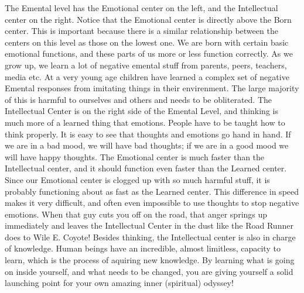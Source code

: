 \documentclass[12pt,letterpaper]{book}
\begin{document}
The Emental level has the Emotional center on the left, and the Intellectual center on the right. Notice that the Emotional center is directly above the Born center. This is important because there is a similar relationship between the centers on this level as those on the lowest one. We are born with certain basic emotional functions, and these parts of us more or less function correctly. As we grow up, we learn a lot of negative emental stuff from parents, peers, teachers, media etc. At a very young age children have learned a complex set of negative Emental responses from imitating things in their envirenment. The large majority of this is harmful to ourselves and others and needs to be obliterated. The Intellectual Center is on the right side of the Emental Level, and thinking is much more of a learned thing that emotions. People have to be taught how to think properly. It is easy to see that thoughts and emotions go hand in hand. If we are in a bad mood, we will have bad thoughts; if we are in a good mood we will have happy thoughts. The Emotional center is much faster than the Intellectual center, and it should function even faster than the Learned center. Since our Emotional center is clogged up with so much harmful stuff, it is probably functioning about as fast as the Learned center. This difference in speed makes it very difficult, and often even impossible to use thoughts to stop negative emotions. When that guy cuts you off on the road, that anger springs up immediately and leaves the Intellectual Center in the dust like the Road Runner does to Wile E. Coyote! Besides thinking, the Intellectual center is also in charge of knowledge. Human beings have an incredible, almost limitless, capacity to learn, which is the process of aquiring new knowledge. By learning what is going on inside yourself, and what needs to be changed, you are giving yourself a solid launching point for your own amazing inner (spiritual) odyssey! 
\end{document}

